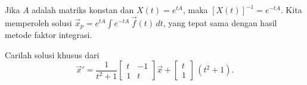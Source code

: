 Jika $A$ adalah matriks konstan dan $X(t) = e^{tA}$, maka
$\left[X(t)\right]^{-1} = e^{-tA}$.  
Kita memperoleh solusi
$\vec{x}_p = 
e^{tA}
\int e^{-tA}\,\vec{f}(t) \, dt$,
yang tepat sama dengan hasil metode faktor integrasi.

\begin{example}
Carilah solusi khusus dari
\begin{equation} \label{nhsys:vcexeq}
{\vec{x}}'
=
\frac{1}{t^2+1}
\begin{bmatrix}
t & -1 \\
1 & t
\end{bmatrix}
\vec{x}
+ \begin{bmatrix} t \\ 1 \end{bmatrix} \,(t^2+1) .
\end{equation}


\end{example}
